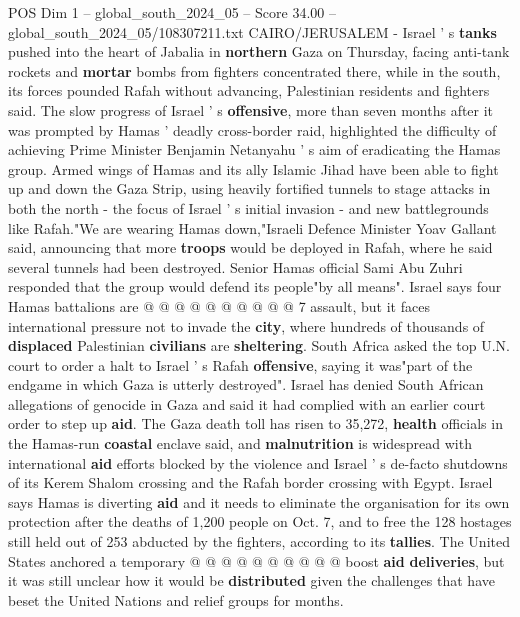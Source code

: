 \begin{textsample}{POS Dim 1 – global\_south\_2024\_05 – Score 34.00 – global\_south\_2024\_05/108307211.txt}  \label{ex:f1_pos_078}
CAIRO/JERUSALEM - Israel ' s \textbf{tanks} pushed into the heart of Jabalia in \textbf{northern} Gaza on Thursday, facing anti-tank rockets and \textbf{mortar} bombs from fighters concentrated there, while in the south, its forces pounded Rafah without advancing, Palestinian residents and fighters said.
The slow progress of Israel ' s \textbf{offensive}, more than seven months after it was prompted by Hamas ' deadly cross-border raid, highlighted the difficulty of achieving Prime Minister Benjamin Netanyahu ' s aim of eradicating the Hamas group.
Armed wings of Hamas and its ally Islamic Jihad have been able to fight up and down the Gaza Strip, using heavily fortified tunnels to stage attacks in both the north - the focus of Israel ' s initial invasion - and new battlegrounds like Rafah."We are wearing Hamas down,"Israeli Defence Minister Yoav Gallant said, announcing that more \textbf{troops} would be deployed in Rafah, where he said several tunnels had been destroyed.
Senior Hamas official Sami Abu Zuhri responded that the group would defend its people"by all means".
Israel says four Hamas battalions are @ @ @ @ @ @ @ @ @ @ 7 assault, but it faces international pressure not to invade the \textbf{city}, where hundreds of thousands of \textbf{displaced} Palestinian \textbf{civilians} are \textbf{sheltering}.
South Africa asked the top U.N. court to order a halt to Israel ' s Rafah \textbf{offensive}, saying it was"part of the endgame in which Gaza is utterly destroyed".
Israel has denied South African allegations of genocide in Gaza and said it had complied with an earlier court order to step up \textbf{aid}.
The Gaza death toll has risen to 35,272, \textbf{health} officials in the Hamas-run \textbf{coastal} enclave said, and \textbf{malnutrition} is widespread with international \textbf{aid} efforts blocked by the violence and Israel ' s de-facto shutdowns of its Kerem Shalom crossing and the Rafah border crossing with Egypt.
Israel says Hamas is diverting \textbf{aid} and it needs to eliminate the organisation for its own protection after the deaths of 1,200 people on Oct. 7, and to free the 128 hostages still held out of 253 abducted by the fighters, according to its \textbf{tallies}.
The United States anchored a temporary @ @ @ @ @ @ @ @ @ @ boost \textbf{aid} \textbf{deliveries}, but it was still unclear how it would be \textbf{distributed} given the challenges that have beset the United Nations and relief groups for months.

\end{textsample}
